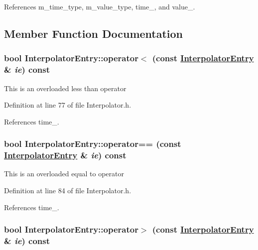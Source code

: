 References m\_\-time\_\-type, m\_\-value\_\-type, time\_\-, and value\_\-.

\subsection{Member Function Documentation}
\hypertarget{classInterpolatorEntry_a2}{
\subsubsection[operator$<$]{\setlength{\rightskip}{0pt plus 5cm}bool Interpolator\-Entry::operator$<$ (const \hyperlink{classInterpolatorEntry}{Interpolator\-Entry} \& {\em ie}) const}}
\label{classInterpolatorEntry_a2}


This is an overloaded less than operator 

Definition at line 77 of file Interpolator.h.

References time\_\-.\hypertarget{classInterpolatorEntry_a3}{
\subsubsection[operator==]{\setlength{\rightskip}{0pt plus 5cm}bool Interpolator\-Entry::operator== (const \hyperlink{classInterpolatorEntry}{Interpolator\-Entry} \& {\em ie}) const}}
\label{classInterpolatorEntry_a3}


This is an overloaded equal to operator 

Definition at line 84 of file Interpolator.h.

References time\_\-.\hypertarget{classInterpolatorEntry_a4}{
\subsubsection[operator$>$]{\setlength{\rightskip}{0pt plus 5cm}bool Interpolator\-Entry::operator$>$ (const \hyperlink{classInterpolatorEntry}{Interpolator\-Entry} \& {\em ie}) const}}
\label{classInterpolatorEntry_a4}



